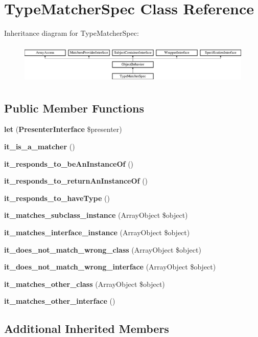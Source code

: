 \section{Type\+Matcher\+Spec Class Reference}
\label{classspec_1_1_php_spec_1_1_matcher_1_1_type_matcher_spec}
Inheritance diagram for Type\+Matcher\+Spec\+:\begin{figure}[H]
\begin{center}
\leavevmode
\includegraphics[height=1.953488cm]{classspec_1_1_php_spec_1_1_matcher_1_1_type_matcher_spec}
\end{center}
\end{figure}
\subsection*{Public Member Functions}
\begin{DoxyCompactItemize}
\item 
{\bf let} ({\bf Presenter\+Interface} \$presenter)
\item 
{\bf it\+\_\+is\+\_\+a\+\_\+matcher} ()
\item 
{\bf it\+\_\+responds\+\_\+to\+\_\+be\+An\+Instance\+Of} ()
\item 
{\bf it\+\_\+responds\+\_\+to\+\_\+return\+An\+Instance\+Of} ()
\item 
{\bf it\+\_\+responds\+\_\+to\+\_\+have\+Type} ()
\item 
{\bf it\+\_\+matches\+\_\+subclass\+\_\+instance} (Array\+Object \$object)
\item 
{\bf it\+\_\+matches\+\_\+interface\+\_\+instance} (Array\+Object \$object)
\item 
{\bf it\+\_\+does\+\_\+not\+\_\+match\+\_\+wrong\+\_\+class} (Array\+Object \$object)
\item 
{\bf it\+\_\+does\+\_\+not\+\_\+match\+\_\+wrong\+\_\+interface} (Array\+Object \$object)
\item 
{\bf it\+\_\+matches\+\_\+other\+\_\+class} (Array\+Object \$object)
\item 
{\bf it\+\_\+matches\+\_\+other\+\_\+interface} ()
\end{DoxyCompactItemize}
\subsection*{Additional Inherited Members}


